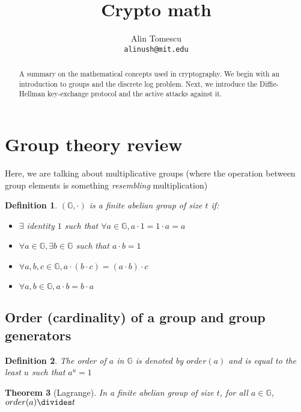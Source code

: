 \documentclass[12pt]{article}
\newtheorem{thm}{Theorem}[section]
\newtheorem{definition}[thm]{Definition}
\newcommand{\G}{\mathbb{G}}
\begin{document}
\title{Crypto math}
\author{Alin Tomescu\\
  \texttt{alinush@mit.edu}}

\maketitle

\begin{abstract}
A summary on the mathematical concepts used in cryptography. We begin with an introduction to groups and the discrete log problem. Next, we introduce the Diffie-Hellman key-exchange protocol and the active attacks against it.
\end{abstract}

\tableofcontents

\newpage

\section{Group theory review}

Here, we are talking about multiplicative groups (where the operation between
group elements is something \emph{resembling} multiplication)

\begin{definition}
$(\G, \cdot)$ is a \emph{finite abelian group} of size $t$ if:
\begin{itemize}
  \item $\exists$ identity $1$ such that $\forall a \in \G, a\cdot 1 = 1\cdot a = a$
  \item $\forall a     \in \G, \exists b \in \G$ such that $a\cdot b = 1$
  \item $\forall a,b,c \in \G, a\cdot (b\cdot c) = (a\cdot b)\cdot c$
  \item $\forall a,b   \in \G, a\cdot b = b\cdot a$
\end{itemize}
\end{definition}

\subsection{Order (cardinality) of a group and group generators}

\begin{definition}
The \emph{order} of $a$ in $\G$ is denoted by $order(a)$ and is equal to the least $u$ such that $a^u = 1$
\end{definition}

\begin{thm}[Lagrange]
In a finite abelian group of size $t$, for all $a \in \G$, $order(a) \divides t$
\end{thm}
\end{document}
